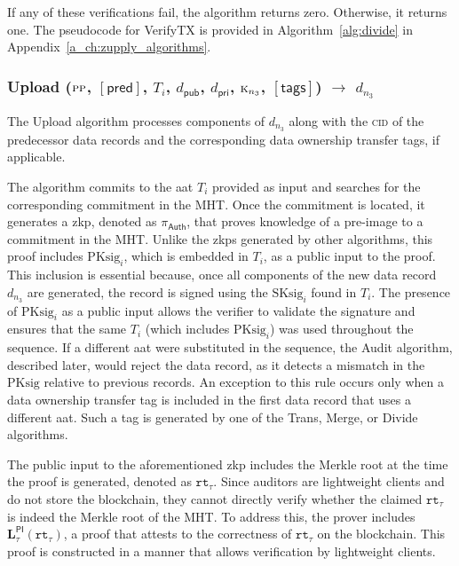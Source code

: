 If any of these verifications fail, the algorithm returns zero. Otherwise, it returns one.
The pseudocode for \textsf{VerifyTX} is provided in Algorithm~\ref{alg:divide} in Appendix~\ref{a_ch:zupply_algorithms}.


\subsubsection{\textsf{Upload} ($\textsc{pp}$, $[\textsf{pred}]$, $T_i$, $d_{\mathsf{pub}}$, $d_{\mathsf{pri}}$, $\textsc{k}_{n_3}$, $[\textsf{tags}]$) $\rightarrow$ $d_{n_3}$}

The \textsf{Upload} algorithm processes components of $d_{n_3}$ along with the \textsc{cid} of the predecessor data records and the corresponding data ownership transfer tags, if applicable. 

The algorithm commits to the \gls{aat} $T_i$ provided as input and searches for the corresponding commitment in the \textsf{MHT}. Once the commitment is located, it generates a \gls{zkp}, denoted as $\pi_\mathsf{Auth}$, that proves knowledge of a pre-image to a commitment in the \textsf{MHT}. Unlike the \glspl{zkp} generated by other algorithms, this proof includes $\text{PKsig}_i$, which is embedded in $T_i$, as a public input to the proof.
This inclusion is essential because, once all components of the new data record $d_{n_3}$ are generated, the record is signed using the $\text{SKsig}_i$ found in $T_i$. The presence of $\text{PKsig}_i$ as a public input allows the verifier to validate the signature and ensures that the same $T_i$ (which includes $\text{PKsig}_i$) was used throughout the sequence. If a different \gls{aat} were substituted in the sequence, the \textsf{Audit} algorithm, described later, would reject the data record, as it detects a mismatch in the $\text{PKsig}$ relative to previous records. An exception to this rule occurs only when a data ownership transfer tag is included in the first data record that uses a different \gls{aat}. Such a tag is generated by one of the \textsf{Trans}, \textsf{Merge}, or \textsf{Divide} algorithms. 

The public input to the aforementioned \gls{zkp} includes the Merkle root at the time the proof is generated, denoted as $\texttt{rt}_\tau$. Since auditors are lightweight clients and do not store the blockchain, they cannot directly verify whether the claimed $\texttt{rt}_\tau$ is indeed the Merkle root of the \textsf{MHT}. To address this, the prover includes $\mathbf{L}_\tau^\mathsf{PI}(\texttt{rt}_\tau)$, a proof that attests to the correctness of $\texttt{rt}_\tau$ on the blockchain. This proof is constructed in a manner that allows verification by lightweight clients. 

